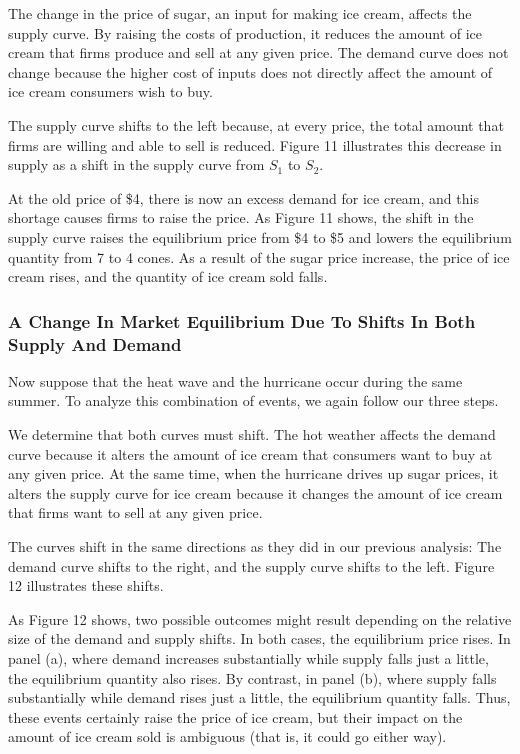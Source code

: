 \ben
\item The change in the price of sugar, an input for making ice cream, affects the supply curve. By raising the costs
of production, it reduces the amount of ice cream that firms produce and sell at any given price. The demand curve
does not change because the higher cost of inputs does not directly affect the amount of ice cream consumers wish to
buy.
\item The supply curve shifts to the left because, at every price, the total amount that firms are willing and able
to sell is reduced. Figure 11 illustrates this decrease in supply as a shift in the supply curve from $S_1$ to $S_2$.
\item At the old price of \$4, there is now an excess demand for ice cream, and this shortage causes firms to raise
the price. As Figure 11 shows, the shift in the supply curve raises the equilibrium price from \$4 to \$5 and lowers
the equilibrium quantity from 7 to 4 cones. As a result of the sugar price increase, the price of ice cream rises,
and the quantity of ice cream sold falls.
\een

\subsubsection*{A Change In Market Equilibrium Due To Shifts In Both Supply And Demand}


Now suppose that the heat wave and the hurricane occur during the same summer. To analyze this combination of events,
we again follow our three steps.

\ben
\item We determine that both curves must shift. The hot weather affects the demand curve because it alters the amount
of ice cream that consumers want to buy at any given price. At the same time, when the hurricane drives up sugar
prices, it alters the supply curve for ice cream because it changes the amount of ice cream that firms want to sell
at any given price.
\item The curves shift in the same directions as they did in our previous analysis: The demand curve shifts to the
right, and the supply curve shifts to the left. Figure 12 illustrates these shifts.
\item As Figure 12 shows, two possible outcomes might result depending on the relative size of the demand and supply
shifts. In both cases, the equilibrium price rises. In panel (a), where demand increases substantially while supply
falls just a little, the equilibrium quantity also rises. By contrast, in panel (b), where supply falls substantially
while demand rises just a little, the equilibrium quantity falls. Thus, these events certainly raise the price of ice
cream, but their impact on the amount of ice cream sold is ambiguous (that is, it could go either way).
\een

